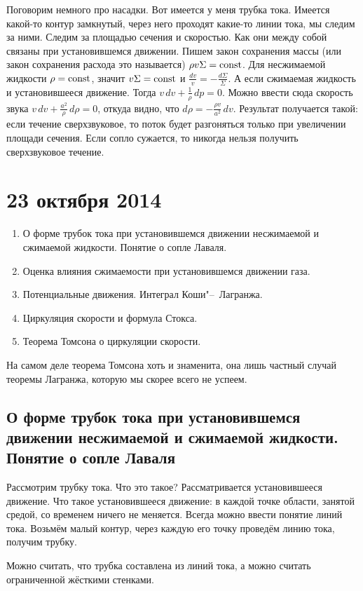 Поговорим немного про насадки. Вот имеется у меня трубка тока. Имеется какой-то контур замкнутый, через него проходят какие-то линии тока, мы следим за ними. Следим за площадью сечения и скоростью. Как они между собой связаны при установившемся движении. Пишем закон сохранения массы (или закон сохранения расхода это называется) $\rho v \Sigma = \operatorname{const}$. Для несжимаемой жидкости  $\rho=\operatorname{const}$, значит $v\Sigma=\operatorname{const}$ и $\frac{dv}{v} = -\frac{d\Sigma}\Sigma$. А если сжимаемая жидкость и установившееся движение. Тогда $v\,dv + \frac1\rho\,dp = 0$. Можно ввести сюда скорость звука $v\,dv + \frac{a^2}\rho\,d\rho = 0$, откуда видно, что $d\rho = -\frac{\rho v}{a^2}\,dv$. Результат получается такой: если течение сверхзвуковое, то поток будет разгоняться только при увеличении площади сечения. Если сопло сужается, то никогда нельзя получить сверхзвуковое течение.


\section{23 октября 2014}
\begin{enumerate}
  \item О форме трубок тока при установившемся движении несжимаемой и сжимаемой жидкости. Понятие о сопле Лаваля.
  \item Оценка влияния сжимаемости при установившемся движении газа.
  \item Потенциальные движения. Интеграл Коши"--~Лагранжа.
  \item Циркуляция скорости и формула Стокса.
  \item Теорема Томсона о циркуляции скорости.
\end{enumerate}
На самом деле теорема Томсона хоть и знаменита, она лишь частный случай теоремы Лагранжа, которую мы скорее всего не успеем.
\subsection{О форме трубок тока при установившемся движении несжимаемой и сжимаемой жидкости. Понятие о сопле Лаваля}
Рассмотрим трубку тока. Что это такое? Рассматривается установившееся движение. Что такое установившееся движение: в каждой точке области, занятой средой, со временем ничего не меняется. Всегда можно ввести понятие линий тока. Возьмём малый контур, через каждую его точку проведём линию тока, получим трубку.

Можно считать, что трубка составлена из линий тока, а можно считать ограниченной жёсткими стенками.


